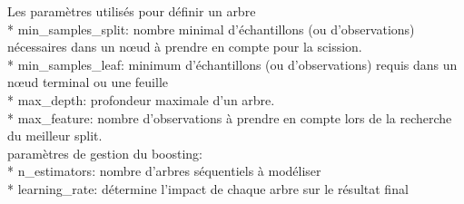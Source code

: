 \documentclass[11pt]{article}
\begin{document}
Les paramètres utilisés pour définir un arbre \\
* min\_samples\_split: nombre minimal d'échantillons (ou d'observations) nécessaires dans un nœud à prendre en compte pour la scission.\\
* min\_samples\_leaf: minimum d'échantillons (ou d'observations) requis dans un nœud terminal ou une
feuille\\
* max\_depth: profondeur maximale d'un arbre.\\
* max\_feature: nombre d'observations à prendre en compte lors de la recherche du meilleur split.\\

paramètres de gestion du boosting:\\
* n\_estimators: nombre d'arbres séquentiels à modéliser\\
* learning\_rate: détermine l'impact de chaque arbre sur le résultat final
\end{document}
